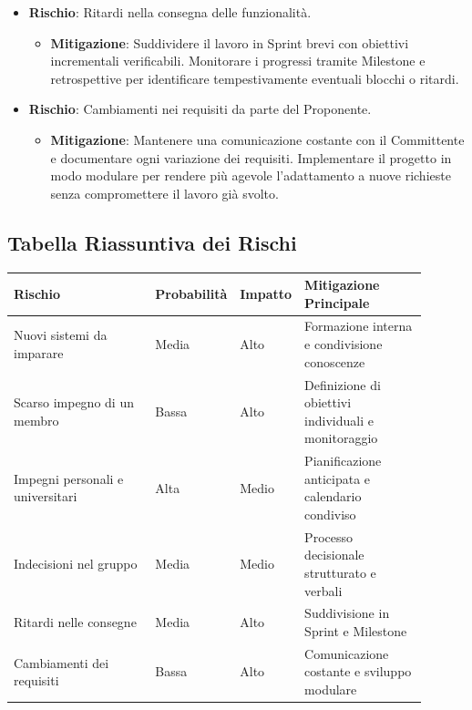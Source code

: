 \documentclass[a4paper,12pt]{article}
\begin{document}
\begin{itemize}
    \item \textbf{Rischio}: Ritardi nella consegna delle funzionalità.
        \begin{itemize}
            \item \textbf{Mitigazione}: Suddividere il lavoro in Sprint brevi con obiettivi incrementali verificabili. Monitorare i progressi tramite Milestone e retrospettive per identificare tempestivamente eventuali blocchi o ritardi.
        \end{itemize}
    
    \item \textbf{Rischio}: Cambiamenti nei requisiti da parte del Proponente.
        \begin{itemize}
            \item \textbf{Mitigazione}: Mantenere una comunicazione costante con il Committente e documentare ogni variazione dei requisiti. Implementare il progetto in modo modulare per rendere più agevole l’adattamento a nuove richieste senza compromettere il lavoro già svolto.
        \end{itemize}
\end{itemize}

\vspace{0.5cm}
\subsection{Tabella Riassuntiva dei Rischi}

\begin{center}
    \small
    \renewcommand{\arraystretch}{1.2}
    \begin{tabular}{|p{0.35\linewidth}|p{0.15\linewidth}|p{0.10\linewidth}|p{0.30\linewidth}|}
        \hline
        \rowcolor{gray!60}
        \textbf{Rischio} & \textbf{Probabilità} & \textbf{Impatto} & \textbf{Mitigazione Principale} \\
        \hline
        \rowcolor{white}
        Nuovi sistemi da imparare & Media & Alto & Formazione interna e condivisione conoscenze \\
        \hline
        \rowcolor{gray!20}
        Scarso impegno di un membro & Bassa & Alto & Definizione di obiettivi individuali e monitoraggio \\
        \hline
        \rowcolor{white}
        Impegni personali e universitari & Alta & Medio & Pianificazione anticipata e calendario condiviso \\
        \hline
        \rowcolor{gray!20}
        Indecisioni nel gruppo & Media & Medio & Processo decisionale strutturato e verbali \\
        \hline
        \rowcolor{white}
        Ritardi nelle consegne & Media & Alto & Suddivisione in Sprint e Milestone \\
        \hline
        \rowcolor{gray!20}
        Cambiamenti dei requisiti & Bassa & Alto & Comunicazione costante e sviluppo modulare \\
        \hline
    \end{tabular}
\end{center}
\end{document}
